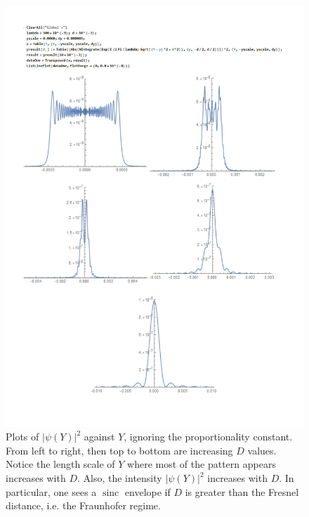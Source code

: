 \documentclass[a4paper]{article}
\DeclareMathOperator{\sinc}{sinc}
\theoremstyle{new}
\begin{document}
\newpage
\begin{figure}[H]
    \centering
    \includegraphics[width=\linewidth]{31.pdf}
    \caption{Plots of $|\psi(Y)|^2$ against $Y$, ignoring the proportionality constant. From left to right, then top to bottom are increasing $D$ values. Notice the length scale of $Y$ where most of the pattern appears increases with $D$. Also, the intensity $|\psi(Y)|^2$ increases with $D$. In particular, one sees a $\sinc$ envelope if $D$ is greater than the Fresnel distance, i.e. the Fraunhofer regime.}
\end{figure}
\newpage
\end{document}
